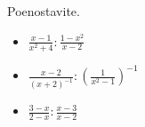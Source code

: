         
            \begin{naloga}
                Poenostavite.
                \begin{itemize}
                    \item $\frac{x-1}{x^2+4}:\frac{1-x^2}{x-2}$ 
                    \item $\frac{x-2}{(x+2)^{-1}}:\left(\frac{1}{x^2-1}\right)^{-1}$ 
                    \item $\frac{3-x}{2-x}:\frac{x-3}{x-2}$ 
                \end{itemize}
            \end{naloga}
        

